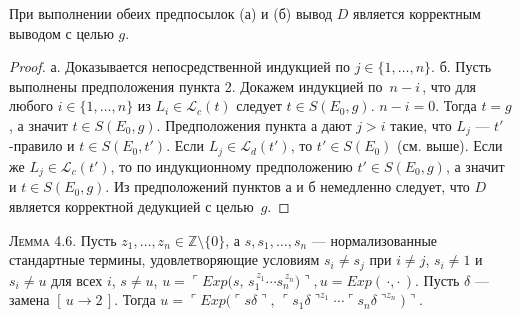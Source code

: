 При выполнении обеих предпосылок (а) и (б)
вывод \(D\) является корректным 
выводом с целью \(g\).

\begin{proof}
а. Доказывается непосредственной индукцией по
$j\in\{1,\dots,n\}$.
б. Пусть выполнены предположения пункта 2.  
Докажем индукцией по $\,n-i\,$, что для любого
$i\in\{1,\dots,n\}$ из $L_{i}\in\mathcal L_{c}(t)$ следует
$t\in S(E_{0},g)$.
$n-i=0$.  
Тогда $t=g$, а значит $t\in S(E_{0},g)$.
Предположения пункта а дают
$j>i$ такие, что $L_{j}$ — $t'$-правило и
$t\in S(E_{0},t')$.
Если $L_{j}\in\mathcal L_{d}(t')$, то
$t'\in S(E_{0})$ (см. выше).
Если же $L_{j}\in\mathcal L_{c}(t')$, то по
индукционному предположению $t'\in S(E_{0},g)$,
а значит и $t\in S(E_{0},g)$.
Из предположений пунктов а и б немедленно
следует, что $D$ является корректной
дедукцией с целью~$g$.
\end{proof}

\textsc{Лемма 4.6.}
Пусть $z_{1},\dots ,z_{n}\in\mathbb Z\setminus\{0\}$,
а $s,s_{1},\dots ,s_{n}$ — нормализованные стандартные термины,
удовлетворяющие условиям
$s_{i}\neq s_{j}$ при $i\neq j$, 
$s_{i}\neq1$ и $s_{i}\neq u$ для всех $i$,
$s\neq u$,
\(
  u=\ulcorner Exp\bigl(s,\,
       s_{1}^{\,z_{1}}\!\cdots s_{n}^{\,z_{n}}\bigr)\urcorner,
  u=Exp(\,\cdot,\cdot\,).
\)
Пусть $\delta$ — замена $[\,u\!\rightarrow\!2\,]$.
Тогда
\(
  u
  =
  \ulcorner Exp\bigl(\ulcorner s\delta\urcorner,\,
        \ulcorner s_{1}\delta\urcorner^{z_{1}}\!\cdots
        \ulcorner s_{n}\delta\urcorner^{z_{n}}\bigr)\urcorner.
\)

